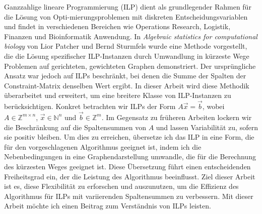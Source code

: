 \documentclass{report}
\theoremstyle{definition}
\begin{document}
Ganzzahlige lineare Programmierung (ILP) dient als grundlegender Rahmen für die Lösung von Opti-mierungsproblemen mit diskreten Entscheidungsvariablen und findet in verschiedenen Bereichen wie Operations Research, Logistik, Finanzen und Bioinformatik Anwendung. In \textit{Algebraic statistics for computational biology} von Lior Patcher und Bernd Sturmfels wurde eine Methode vorgestellt, die die Lösung spezifischer ILP-Instanzen durch Umwandlung in kürzeste Wege Problemen auf gerichteten, gewichteten Graphen demonstriert. Der ursprüngliche Ansatz war jedoch auf ILPs beschränkt, bei denen die Summe der Spalten der Constraint-Matrix denselben Wert ergibt. In dieser Arbeit wird diese Methodik überarbeitet und erweitert, um eine breitere Klasse von ILP-Instanzen zu berücksichtigen. Konkret betrachten wir ILPs der Form $A\vec x = \vec b$, wobei $A\in \mathbb{Z}^{m \times n}$, $\vec x \in \mathbb{N}^n$ und $\vec b \in \mathbb{Z}^m$. Im Gegensatz zu früheren Arbeiten lockern wir die Beschränkung auf die Spaltensummen von $A$ und lassen Variabilität zu, sofern sie positiv bleiben. Um dies zu erreichen, übersetze ich das ILP in eine Form, die für den vorgeschlagenen Algorithmus geeignet ist, indem ich die Nebenbedingungen in eine Graphendarstellung umwandle, die für die Berechnung des kürzesten Weges geeignet ist. Diese Übersetzung führt einen entscheidenden Freiheitsgrad ein, der die Leistung des Algorithmus beeinflusst. Ziel dieser Arbeit ist es, diese Flexibilität zu erforschen und auszunutzen, um die Effizienz des Algorithmus für ILPs mit variierenden Spaltensummen zu verbessern. Mit dieser Arbeit möchte ich einen Beitrag zum Verständnis von ILPs leisten.



\tableofcontents





% 

\newpage
\thispagestyle{empty}
\end{document}
